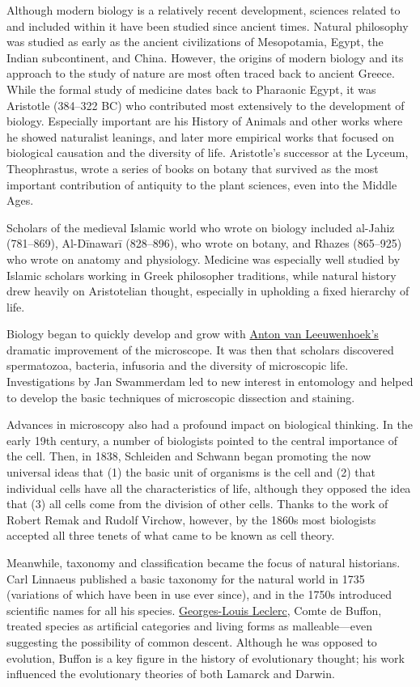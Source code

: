 Although modern biology is a relatively recent development, sciences related to and included within it have been studied since ancient times. Natural philosophy was studied as early as the ancient civilizations of Mesopotamia, Egypt, the Indian subcontinent, and China. However, the origins of modern biology and its approach to the study of nature are most often traced back to ancient Greece. While the formal study of medicine dates back to Pharaonic Egypt, it was Aristotle (384--322 BC) who contributed most extensively to the development of biology. Especially important are his History of Animals and other works where he showed naturalist leanings, and later more empirical works that focused on biological causation and the diversity of life. Aristotle's successor at the Lyceum, Theophrastus, wrote a series of books on botany that survived as the most important contribution of antiquity to the plant sciences, even into the Middle Ages.

Scholars of the medieval Islamic world who wrote on biology included al-Jahiz (781--869), Al-Dīnawarī (828--896), who wrote on botany, and Rhazes (865--925) who wrote on anatomy and physiology. Medicine was especially well studied by Islamic scholars working in Greek philosopher traditions, while natural history drew heavily on Aristotelian thought, especially in upholding a fixed hierarchy of life.

Biology began to quickly develop and grow with \href{https://en.wikipedia.org/wiki/Antonie_van_Leeuwenhoek}{Anton van Leeuwenhoek's} dramatic improvement of the microscope. It was then that scholars discovered spermatozoa, bacteria, infusoria and the diversity of microscopic life. Investigations by Jan Swammerdam led to new interest in entomology and helped to develop the basic techniques of microscopic dissection and staining.

Advances in microscopy also had a profound impact on biological thinking. In the early 19th century, a number of biologists pointed to the central importance of the cell. Then, in 1838, Schleiden and Schwann began promoting the now universal ideas that (1) the basic unit of organisms is the cell and (2) that individual cells have all the characteristics of life, although they opposed the idea that (3) all cells come from the division of other cells. Thanks to the work of Robert Remak and Rudolf Virchow, however, by the 1860s most biologists accepted all three tenets of what came to be known as cell theory.

Meanwhile, taxonomy and classification became the focus of natural historians. Carl Linnaeus published a basic taxonomy for the natural world in 1735 (variations of which have been in use ever since), and in the 1750s introduced scientific names for all his species. \href{https://en.wikipedia.org/wiki/Georges-Louis_Leclerc,_Comte_de_Buffon}{Georges-Louis Leclerc}, Comte de Buffon, treated species as artificial categories and living forms as malleable---even suggesting the possibility of common descent. Although he was opposed to evolution, Buffon is a key figure in the history of evolutionary thought; his work influenced the evolutionary theories of both Lamarck and Darwin.

